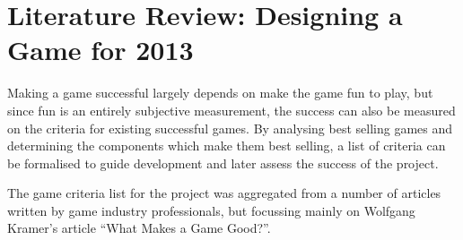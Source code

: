 
\section{Literature Review: Designing a Game for 2013}

Making a game successful largely depends on make the game fun to play, but since fun is an entirely subjective measurement, the success can also be measured on the criteria for existing successful games. By analysing best selling games and determining the components which make them best selling, a list of criteria can be formalised to guide development and later assess the success of the project.

The game criteria list for the project was aggregated from a number of articles written by game industry professionals, but focussing mainly on Wolfgang Kramer's article ``What Makes a Game Good?''.


